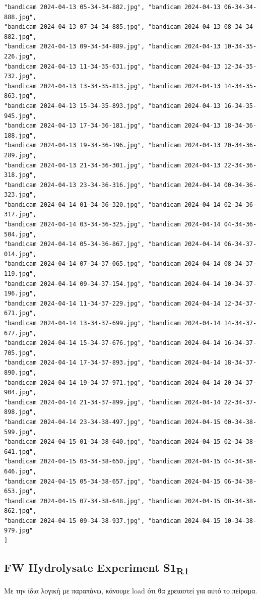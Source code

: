 \documentclass[11pt]{article}
\begin{document}
\begin{verbatim}
"bandicam 2024-04-13 05-34-34-882.jpg", "bandicam 2024-04-13 06-34-34-888.jpg",
"bandicam 2024-04-13 07-34-34-885.jpg", "bandicam 2024-04-13 08-34-34-882.jpg",
"bandicam 2024-04-13 09-34-34-889.jpg", "bandicam 2024-04-13 10-34-35-226.jpg",
"bandicam 2024-04-13 11-34-35-631.jpg", "bandicam 2024-04-13 12-34-35-732.jpg",
"bandicam 2024-04-13 13-34-35-813.jpg", "bandicam 2024-04-13 14-34-35-863.jpg",
"bandicam 2024-04-13 15-34-35-893.jpg", "bandicam 2024-04-13 16-34-35-945.jpg",
"bandicam 2024-04-13 17-34-36-181.jpg", "bandicam 2024-04-13 18-34-36-188.jpg",
"bandicam 2024-04-13 19-34-36-196.jpg", "bandicam 2024-04-13 20-34-36-289.jpg",
"bandicam 2024-04-13 21-34-36-301.jpg", "bandicam 2024-04-13 22-34-36-318.jpg",
"bandicam 2024-04-13 23-34-36-316.jpg", "bandicam 2024-04-14 00-34-36-323.jpg",
"bandicam 2024-04-14 01-34-36-320.jpg", "bandicam 2024-04-14 02-34-36-317.jpg",
"bandicam 2024-04-14 03-34-36-325.jpg", "bandicam 2024-04-14 04-34-36-504.jpg",
"bandicam 2024-04-14 05-34-36-867.jpg", "bandicam 2024-04-14 06-34-37-014.jpg",
"bandicam 2024-04-14 07-34-37-065.jpg", "bandicam 2024-04-14 08-34-37-119.jpg",
"bandicam 2024-04-14 09-34-37-154.jpg", "bandicam 2024-04-14 10-34-37-196.jpg",
"bandicam 2024-04-14 11-34-37-229.jpg", "bandicam 2024-04-14 12-34-37-671.jpg",
"bandicam 2024-04-14 13-34-37-699.jpg", "bandicam 2024-04-14 14-34-37-677.jpg",
"bandicam 2024-04-14 15-34-37-676.jpg", "bandicam 2024-04-14 16-34-37-705.jpg",
"bandicam 2024-04-14 17-34-37-893.jpg", "bandicam 2024-04-14 18-34-37-890.jpg",
"bandicam 2024-04-14 19-34-37-971.jpg", "bandicam 2024-04-14 20-34-37-904.jpg",
"bandicam 2024-04-14 21-34-37-899.jpg", "bandicam 2024-04-14 22-34-37-898.jpg",
"bandicam 2024-04-14 23-34-38-497.jpg", "bandicam 2024-04-15 00-34-38-599.jpg",
"bandicam 2024-04-15 01-34-38-640.jpg", "bandicam 2024-04-15 02-34-38-641.jpg",
"bandicam 2024-04-15 03-34-38-650.jpg", "bandicam 2024-04-15 04-34-38-646.jpg",
"bandicam 2024-04-15 05-34-38-657.jpg", "bandicam 2024-04-15 06-34-38-653.jpg",
"bandicam 2024-04-15 07-34-38-648.jpg", "bandicam 2024-04-15 08-34-38-862.jpg",
"bandicam 2024-04-15 09-34-38-937.jpg", "bandicam 2024-04-15 10-34-38-979.jpg"
]
\end{verbatim}

\subsection{FW Hydrolysate Experiment S1\textsubscript{R1}}
\label{sec:orgd8e66f3}
Με την ίδια λογική με παραπάνω, κάνουμε load ότι θα χρειαστεί για αυτό το πείραμα.
\end{document}
